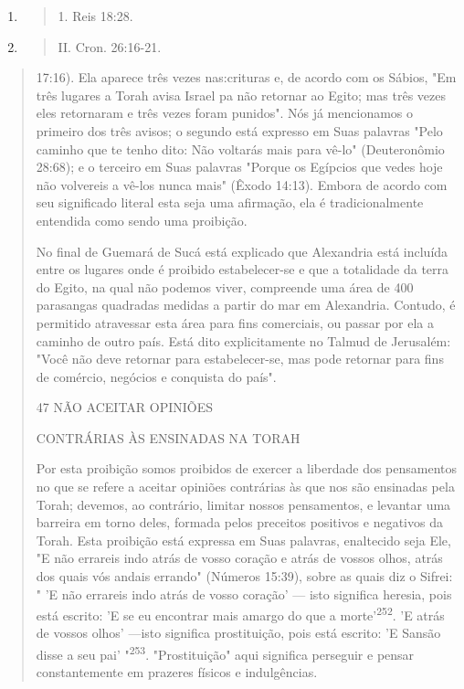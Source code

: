 \begin{enumerate}
\def\labelenumi{\arabic{enumi}.}
\setcounter{enumi}{249}
\item
  \begin{quote}
  1. Reis 18:28.
  \end{quote}
\item
  \begin{quote}
  II. Cron. 26:16-21.
  \end{quote}
\end{enumerate}

\begin{quote}
17:16). Ela aparece três vezes nas:crituras e, de acordo com os Sábios,
"Em três lugares a Torah avisa Israel pa não retornar ao Egito; mas três
vezes eles retornaram e três vezes foram punidos". Nós já mencionamos o
primeiro dos três avisos; o segundo está expresso em Suas palavras "Pelo
caminho que te tenho dito: Não voltarás mais para vê-lo" (Deuteronômio
28:68); e o terceiro em Suas palavras "Porque os Egípcios que vedes hoje
não volvereis a vê-los nunca mais" (Êxodo 14:13). Embora de acordo com
seu significado literal esta seja uma afirmação, ela é tradicionalmente
entendida como sendo uma proibição.

No final de Guemará de Sucá está explicado que Alexandria está in­cluída
entre os lugares onde é proibido estabelecer-se e que a totalidade da
ter­ra do Egito, na qual não podemos viver, compreende uma área de 400
parasan­gas quadradas medidas a partir do mar em Alexandria. Contudo, é
permitido atravessar esta área para fins comerciais, ou passar por ela a
caminho de outro país. Está dito explicitamente no Talmud de Jerusalém:
"Você não deve retor­nar para estabelecer-se, mas pode retornar para
fins de comércio, negócios e conquista do país".

47 NÃO ACEITAR OPINIÕES

CONTRÁRIAS ÀS ENSINADAS NA TORAH

Por esta proibição somos proibidos de exercer a liberdade dos
pen­samentos no que se refere a aceitar opiniões contrárias às que nos
são ensina­das pela Torah; devemos, ao contrário, limitar nossos
pensamentos, e levantar uma barreira em torno deles, formada pelos
preceitos positivos e negativos da Torah. Esta proibição está expressa
em Suas palavras, enaltecido seja Ele, "E não errareis indo atrás de
vosso coração e atrás de vossos olhos, atrás dos quais vós andais
errando" (Números 15:39), sobre as quais diz o Sifrei: " 'E não
erra­reis indo atrás de vosso coração' --- isto significa heresia, pois
está escrito: 'E se eu encontrar mais amargo do que a
morte'\textsuperscript{252}. 'E atrás de vossos olhos' ---isto significa
prostituição, pois está escrito: 'E Sansão disse a seu pai'
"\textsuperscript{253}. "Prostituição" aqui significa perseguir e pensar
constantemente em prazeres físicos e indulgências.


\end{quote}
